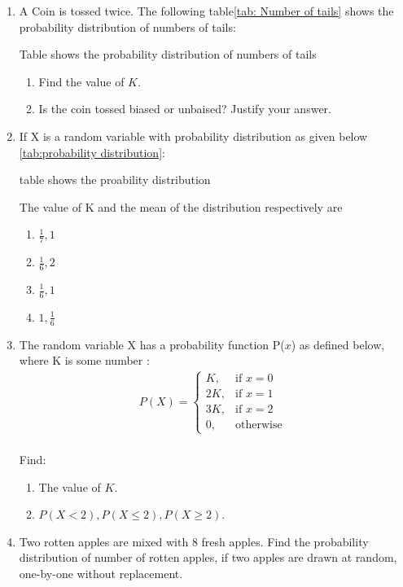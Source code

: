 \begin{enumerate}
[Given that for d.f. = 9, $t_{0.05}$ = 2.26]
\item A Coin is tossed twice. The following table\ref{tab: Number of tails} shows the probability distribution of numbers of tails:
\begin{table}[!ht]
	
\caption{Table shows the probability distribution of numbers of tails \label{tab: Number of tails}}
\end{table}
\begin{enumerate}
\item Find the value of $K$.
\item Is the coin tossed biased or unbaised?
Justify your answer.
\end{enumerate}
\item If X is a random variable with probability distribution as given below \ref{tab:probability distribution}:
\begin{table}[!ht]

\caption{table shows the proability distribution \label{tab:probability distribution}}
\end{table}
\newline The value of K and the mean of the distribution respectively are 
\begin{enumerate}
\item $\frac{1}{7}, 1$
\item $\frac{1}{6}, 2$
\item $\frac{1}{6}, 1$
\item $1, \frac{1}{6}$
\end{enumerate}
\item The random variable X has a probability function P($x$) as defined below, where K is some number :
\\ \begin{align}P(X)=\begin{cases} K, & \text{if }  x=0 \\ 2K, & \text{if } x=1\\ 3K, & \text{if } x=2\\ 0, & \text{otherwise  } \end{cases}\end{align}
\\ Find:
\begin{enumerate}
\item The value of $K$.
\item $P(X<2),P(X \le 2), P(X \ge 2)$.
\end{enumerate}
\item Two rotten apples are mixed with 8 fresh apples. Find the probability distribution of number of rotten apples, if two apples are drawn at  random, one-by-one without replacement.


\end{enumerate}
